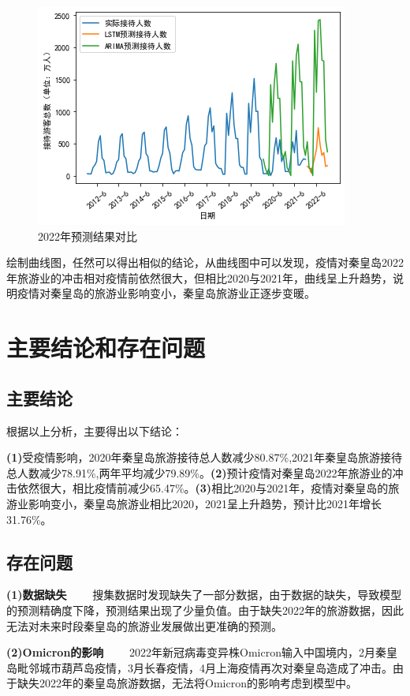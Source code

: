 		\begin{figure}[h]
			\centering
			\includegraphics[scale=0.55,angle=0]{images/19.png}
			\caption{2022年预测结果对比}
			\label{19}
		\end{figure}
		绘制曲线图，任然可以得出相似的结论，从曲线图中可以发现，疫情对秦皇岛2022年旅游业的冲击相对疫情前依然很大，但相比2020与2021年，曲线呈上升趋势，说明疫情对秦皇岛的旅游业影响变小，秦皇岛旅游业正逐步变暖。
		
		
		
\section{主要结论和存在问题}
\subsection{主要结论}
根据以上分析，主要得出以下结论：

\textbf{(1)}受疫情影响，2020年秦皇岛旅游接待总人数减少80.87\%,2021年秦皇岛旅游接待总人数减少78.91\%,两年平均减少79.89\%。\textbf{(2)}预计疫情对秦皇岛2022年旅游业的冲击依然很大，相比疫情前减少65.47\%。\textbf{(3)}相比2020与2021年，疫情对秦皇岛的旅游业影响变小，秦皇岛旅游业相比2020，2021呈上升趋势，预计比2021年增长31.76\%。



\subsection{存在问题}
\textbf{(1)数据缺失}~~~~
搜集数据时发现缺失了一部分数据，由于数据的缺失，导致模型的预测精确度下降，预测结果出现了少量负值。由于缺失2022年的旅游数据，因此无法对未来时段秦皇岛的旅游业发展做出更准确的预测。

\textbf{(2)Omicron的影响}~~~~
2022年新冠病毒变异株Omicron输入中国境内，2月秦皇岛毗邻城市葫芦岛疫情，3月长春疫情，4月上海疫情再次对秦皇岛造成了冲击。由于缺失2022年的秦皇岛旅游数据，无法将Omicron的影响考虑到模型中。

